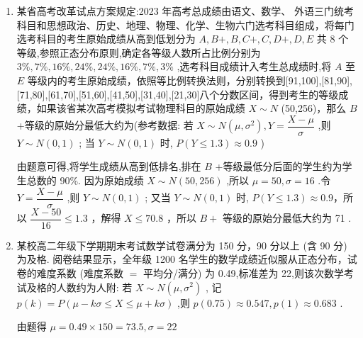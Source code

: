 \begin{enumerate}
\begin{enumerate}
\begin{jieda}
            因为 $\dfrac{38 - {30}}{6} < \dfrac{38 - {34}}{2}$ ,所以 $P\left( {X \leq  {38}}\right)  < P\left( {Y \leq  {38}}\right)$ ,故 A 错误;
            
            又 $P\left( {X \leq  {34}}\right)  > \dfrac{1}{2},P\left( {Y \leq  {34}}\right)  = \dfrac{1}{2},P\left( {X \leq  {34}}\right)  > P\left( {Y \leq  {34}}\right)$ ,故 B 正确;
            
            因为 $P\left( {X \leq  {38}}\right)  < P\left( {Y \leq  {38}}\right)$ ,所以如果有 38 分钟可用,小明应选择自行车,故 ${C}$ 错误;
            
            因为 $P\left( {X \leq  {34}}\right)  > P\left( {Y \leq  {34}}\right)$ ,所以如果有 34 分钟可用,小明应选择坐公交车,故 ${D}$ 错误.
        \end{jieda}
        \item 某省高考改革试点方案规定:2023 年高考总成绩由语文、数学、 外语三门统考科目和思想政治、历史、地理、物理、化学、生物六门选考科目组成，将每门选考科目的考生原始成绩从高到低划分为 $A,B + ,B,C + ,C,D + ,D,E$ 共 8 个等级,参照正态分布原则,确定各等级人数所占比例分别为 $3\% ,7\% ,{16}\% ,{24}\% ,{24}\% ,{16}\% ,7\% ,3\%$ ,选考科目成绩计入考生总成绩时,将 $A$ 至 $E$ 等级内的考生原始成绩，依照等比例转换法则，分别转换到[91,100],[81,90],[71,80],[61,70],[51,60],[41,50],[31,40],[21,30]八个分数区间，得到考生的等级成绩，如果该省某次高考模拟考试物理科目的原始成绩 $X \sim  N$ (50,256)，那么 $B$ +等级的原始分最低大约为(参考数据:    若 $X \sim  N\left( {\mu ,{\sigma }^{2}}\right) ,Y = \dfrac{X - \mu }{\sigma }$ ,则 $Y \sim  N\left( {0,1}\right)$ ;    当 $Y \sim  N\left( {0,1}\right)$ 时, $P\left( {Y \leq  {1.3}}\right)  \approx  {0.9}$ )
        \begin{jieda}
            由题意可得,将学生成绩从高到低排名,排在 $B$ +等级最低分后面的学生约为学生总数的 90\%. 因为原始成绩 $X \sim  N\left( {{50},{256}}\right)$ ,所以 $\mu  = {50},\sigma  = {16}$ .令 $Y = \dfrac{X - \mu }{\sigma }$ ,则 $Y \sim  N\left( {0,1}\right)$ ; 又当 $Y \sim  N\left( {0,1}\right)$ 时, $P\left( {Y \leq  {1.3}}\right)  \approx  {0.9}$，所以 $\dfrac{X - {50}}{16} \leq  {1.3}$ ，解得 $X \leq  {70.8}$ ，所以 $B +$ 等级的原始分最低大约为 71 .
        \end{jieda}
        \item 某校高二年级下学期期末考试数学试卷满分为 150 分，90 分以上 (含 90 分) 为及格. 阅卷结果显示，全年级 1200 名学生的数学成绩近似服从正态分布，试卷的难度系数 (难度系数 $=$ 平均分/满分) 为 0.49,标准差为 22,则该次数学考试及格的人数约为人附: 若 $X \sim  N\left( {\mu ,{\sigma }^{2}}\right)$ , 记 $p\left( k\right)  = P\left( {\mu  - {k\sigma } \leq  X \leq  \mu  + {k\sigma }}\right)$ ,则 $p\left( {0.75}\right)  \approx  {0.547},p\left( 1\right)  \approx  {0.683}$ .
        \begin{jieda}
            由题得 $\mu  = {0.49} \times  {150} = {73.5},\sigma  = {22}$ 
            

\end{jieda}
\end{enumerate}
\end{enumerate}
